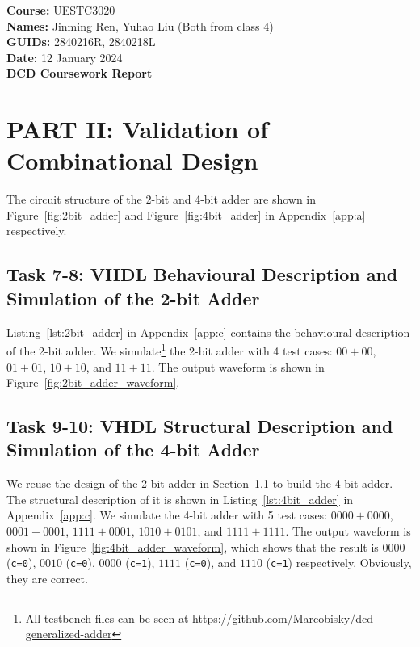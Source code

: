 \documentclass[11pt]{article}
\begin{document}
\noindent \textbf{Course: }UESTC3020 \\
\noindent \textbf{Names: }Jinming Ren, Yuhao Liu (Both from class 4) \\
\noindent \textbf{GUIDs: }2840216R, 2840218L \\
\noindent \textbf{Date:} 12 January 2024 \\

\noindent \Large{\textbf{DCD Coursework Report}}
\vspace{-0.5em}

\fontsize{11pt}{11pt}\selectfont
\linespread{1}

\section{PART II: Validation of Combinational Design}

The circuit structure of the 2-bit and 4-bit adder are shown in Figure~\ref{fig:2bit_adder} and Figure~\ref{fig:4bit_adder} in Appendix~\ref{app:a} respectively.

\subsection{Task 7-8: VHDL Behavioural Description and Simulation of the 2-bit Adder}
\label{sec:task78}

Listing~\ref{lst:2bit_adder} in Appendix~\ref{app:c} contains the behavioural description of the 2-bit adder. We simulate\footnote{All testbench files can be seen at \url{https://github.com/Marcobisky/dcd-generalized-adder}} the 2-bit adder with 4 test cases: $00+00$, $01+01$, $10+10$, and $11+11$. The output waveform is shown in Figure~\ref{fig:2bit_adder_waveform}.

\subsection{Task 9-10: VHDL Structural Description and Simulation of the 4-bit Adder}

We reuse the design of the 2-bit adder in Section~\ref{sec:task78} to build the 4-bit adder. The structural description of it is shown in Listing~\ref{lst:4bit_adder} in Appendix~\ref{app:c}. We simulate the 4-bit adder with 5 test cases: $0000+0000$, $0001+0001$, $1111+0001$, $1010+0101$, and $1111+1111$. The output waveform is shown in Figure~\ref{fig:4bit_adder_waveform}, which shows that the result is $0000$ (\texttt{c=0}), $0010$ (\texttt{c=0}), $0000$ (\texttt{c=1}), $1111$ (\texttt{c=0}), and $1110$ (\texttt{c=1}) respectively. Obviously, they are correct.
\end{document}
